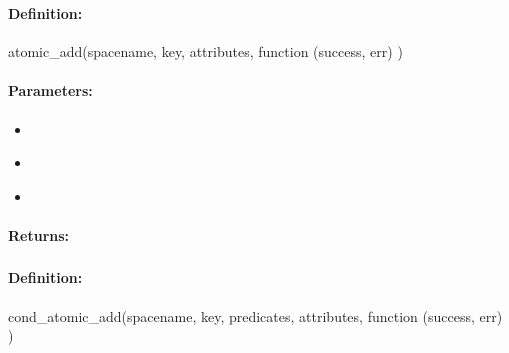 \pagebreak
\subsubsection{}
\label{api:nodejs:atomic_add}


\paragraph{Definition:}
\begin{javascriptcode}
atomic_add(spacename, key, attributes, function (success, err) {})
\end{javascriptcode}
\paragraph{Parameters:}
\begin{itemize}[noitemsep]
\item {}\\

\item {}\\

\item {}\\

\end{itemize}

\paragraph{Returns:}


\pagebreak
\subsubsection{}
\label{api:nodejs:cond_atomic_add}


\paragraph{Definition:}
\begin{javascriptcode}
cond_atomic_add(spacename, key, predicates, attributes, function (success, err) {})
\end{javascriptcode}
